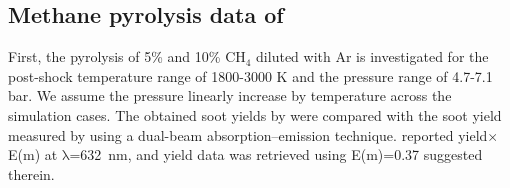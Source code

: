 \subsection{Methane pyrolysis data of \citet{agafonov2016unified}}

First, the pyrolysis of 5\% and 10\% $\mathrm{CH_4}$ diluted with Ar is investigated for the post-shock temperature range of 1800-3000 K and the pressure range of 4.7-7.1 bar. We assume the pressure linearly increase by temperature across the simulation cases. The obtained soot yields by were compared with the soot yield measured by \citet{agafonov2016unified} using a dual-beam absorption–emission technique. \citet{agafonov2016unified} reported yield$\times$E(m) at $\mathrm{\lambda}$=632~nm, and yield data was retrieved using E(m)=0.37 suggested therein. 





